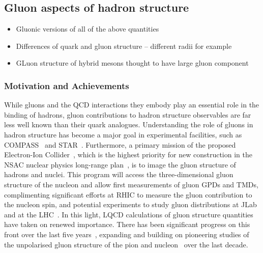 \subsection{Gluon aspects of hadron structure}


\begin{itemize}
	\item Gluonic versions of all of the above quantities
	\item Differences of quark and gluon structure -- different radii for example
	\item GLuon structure of hybrid mesons thought to have large gluon component
\end{itemize}


\subsubsection{Motivation and Achievements}

While gluons and the QCD interactions they embody play an essential role in the binding of hadrons, gluon contributions to hadron structure observables are far less well known than their quark analogues. Understanding the role of gluons in hadron structure has become a major goal in experimental facilities, such as COMPASS~\cite{Adare:2014hsq} and STAR~\cite{Djawotho:2013pga}. Furthermore, a primary mission of the proposed Electron-Ion Collider~\cite{Accardi:2012qut,Kalantarians:2014eda}, which is the highest priority for new construction in the NSAC nuclear physics long-range plan~\cite{Geesaman:2015fha}, is to image the gluon structure of hadrons and nuclei. This program will access the three-dimensional gluon structure of the nucleon and allow first measurements of gluon GPDs and TMDs, complimenting significant efforts at RHIC to measure the gluon contribution to the nucleon spin, and potential experiments to study gluon distributions at JLab~\cite{Maxwell:2018gci,Hattawy:2017woc,Dobbs:2017vjw} and at the LHC~\cite{Baltz:2007kq}. 
%
In this light, LQCD calculations of gluon structure quantities have taken on renewed importance. There has been significant progress on this front over the last five years~\cite{Alexandrou:2017oeh,Yang:2016plb,Detmold:2016gpy,Detmold:2017oqb,Winter:2017bfs,Alexandrou:2016ekb}, expanding and building on pioneering studies of the unpolarised gluon structure of the pion and nucleon~\cite{Meyer:2007tm,Horsley:2012pz,Alexandrou:2013tfa,Deka:2013zha} over the last decade. 


